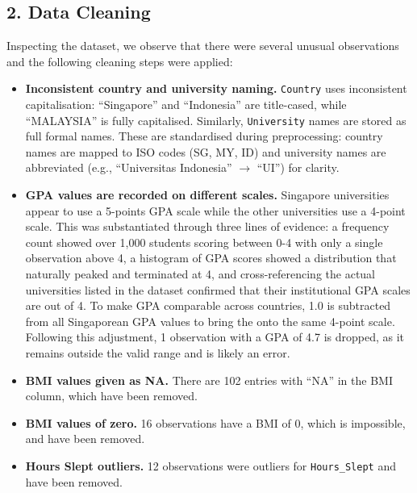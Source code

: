\subsection*{2. Data Cleaning}

Inspecting the dataset, we observe that there were several unusual observations and the following cleaning steps were applied:

\begin{itemize}
    \item \textbf{Inconsistent country and university naming.} \lstinline|Country| uses inconsistent capitalisation: ``Singapore'' and ``Indonesia'' are title-cased, while ``MALAYSIA'' is fully capitalised. Similarly, \lstinline|University| names are stored as full formal names. These are standardised during preprocessing: country names are mapped to ISO codes (SG, MY, ID) and university names are abbreviated (e.g., ``Universitas Indonesia'' $\to$ ``UI'') for clarity.

    \item \textbf{GPA values are recorded on different scales.} Singapore universities appear to use a 5-points GPA scale while the other universities use a 4-point scale. This was substantiated through three lines of evidence: a frequency count showed over 1,000 students scoring between 0-4 with only a single observation above 4, a histogram of GPA scores showed a distribution that naturally peaked and terminated at 4, and cross-referencing the actual universities listed in the dataset confirmed that their institutional GPA scales are out of 4. To make GPA comparable across countries, 1.0 is subtracted from all Singaporean GPA values to bring the onto the same 4-point scale. Following this adjustment, 1 observation with a GPA of 4.7 is dropped, as it remains outside the valid range and is likely an error.  

    \item \textbf{BMI values given as NA.} There are 102 entries with ``NA'' in the BMI column, which have been removed.

    \item \textbf{BMI values of zero.} 16 observations have a BMI of 0, which is impossible, and have been removed.

    \item \textbf{Hours Slept outliers.} 12 observations were outliers for \lstinline|Hours_Slept| and have been removed.
\end{itemize}

